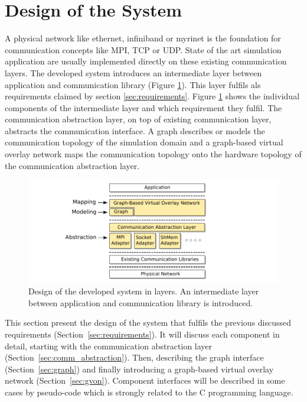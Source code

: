\section{Design of the System}

A physical network like ethernet, infiniband or myrinet is the
foundation for communication concepts like MPI, TCP or UDP.  State of
the art simulation application are usually implemented directly on
these existing communication layers. The developed system introduces
an intermediate layer between application and communication library
(Figure \ref{fig:design}). This layer fulfils als requirements claimed
by section \ref{sec:requirements}. Figure \ref{fig:design} shows the
individual components of the intermediate layer and which requirement
they fulfil. The communication abstraction layer, on top of existing
communication layer, abstracts the communication interface.  A graph
describes or models the communication topology of the simulation
domain and a graph-based virtual overlay network maps the
communication topology onto the hardware topology of the communication
abstraction layer.

\begin{figure}[H]
  \centering \includegraphics[width=\textwidth]{graphics/30_design}
  \caption{Design of the developed system in layers. An intermediate
  layer between application and communication library is introduced.}
  \label{fig:design}
\end{figure}

This section present the design of the system that fulfils the
previous discussed requirements (Section~\ref{sec:requirements}).  It
will discuss each component in detail, starting with the communication
abstraction layer (Section~\ref{sec:comm_abstraction}). Then,
describing the graph interface (Section~\ref{sec:graph}) and finally
introducing a graph-based virtual overlay network
(Section~\ref{sec:gvon}). Component interfaces will be described in
some cases by pseudo-code which is strongly related to the C
programming language.

